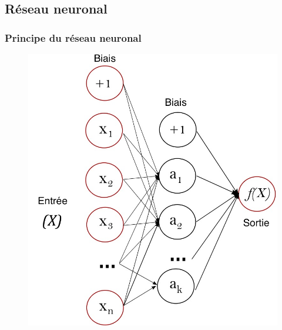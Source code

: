 \documentclass{beamer}
\begin{document}
\subsection{Réseau neuronal}
\begin{frame}
	\frametitle{Principe du réseau neuronal}
	\begin{figure}[t]
		\centering
		\begin{minipage}{0.5\textwidth}
			\includegraphics[scale=0.2]{nn_sk}
		\end{minipage}
	\end{figure}
\end{frame}
\end{document}

